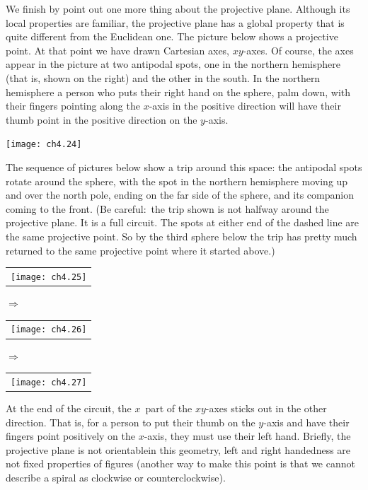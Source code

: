 We finish by point out one more thing about the projective plane. 
Although its local properties are familiar, the projective plane has
a global property that is quite different from the Euclidean one.
The picture below shows a projective point.
At that point we have drawn Cartesian axes, $xy$-axes.
Of course, the axes appear in the picture at two antipodal spots, one in the
northern hemisphere (that is, shown on the right) 
and the other in the
south.
In the northern hemisphere a person who puts 
their right hand on the sphere, palm down, with their fingers pointing 
along the $x$-axis in the 
positive direction
will have their thumb point in the positive direction on the $y$-axis.
\begin{center}
  \texttt{[image: ch4.24]}
\end{center}
The sequence of pictures below 
show a trip around this space: 
the antipodal spots rotate around the sphere, with the spot in the 
northern hemisphere moving up and over the north pole, ending on the
far side of the sphere, and its companion coming to the front.
(Be careful:~the trip shown is not halfway around the projective plane.
It is a full circuit.
The spots at either end of the dashed line are the same 
projective point.
So by the third sphere below the trip has pretty much returned 
to the same projective point where it started above.) 
\begin{center}
  \begin{tabular}{@{}c@{}}\texttt{[image: ch4.25]}\end{tabular}
\qquad\mbox{$\Longrightarrow$}\qquad
  \begin{tabular}{@{}c@{}}\texttt{[image: ch4.26]}\end{tabular}
\qquad\mbox{$\Longrightarrow$}\qquad
  \begin{tabular}{@{}c@{}}\texttt{[image: ch4.27]}\end{tabular}
\end{center}
At the end of the circuit, 
the $x$~part of the $xy$-axes sticks out in the other direction.
That is, for a person to put their thumb on the $y$-axis and 
have their fingers point positively on the $x$-axis, they must
use their left hand.
Briefly, the projective plane is not orientable\Dash in this geometry,
left and right handedness are not fixed properties of figures
(another way to make this point 
is that we cannot describe a spiral as clockwise or
counterclockwise).

